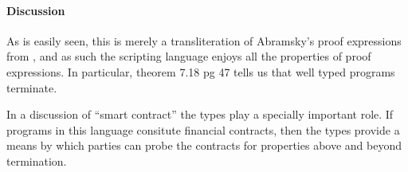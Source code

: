 \documentclass[]{acm_proc_article-sp}
\numberwithin{equation}{subsection}
\begin{document}
\begin{mathpar}
\end{mathpar}

\begin{mathpar}
\end{mathpar}

\begin{mathpar}
\end{mathpar}

\begin{mathpar}
\end{mathpar}

\begin{mathpar}
\end{mathpar}

\paragraph{Discussion}
As is easily seen, this is merely a transliteration of Abramsky's
proof expressions from \cite{DBLP:journals/tcs/Abramsky93}, and as
such the scripting language enjoys all the properties of proof
expressions. In particular, theorem 7.18 pg 47 tells us that well
typed programs terminate.

In a discussion of ``smart contract'' the types play a specially
important role. If programs in this language consitute financial
contracts, then the types provide a means by which parties can probe
the contracts for properties above and beyond termination.

\end{document}
